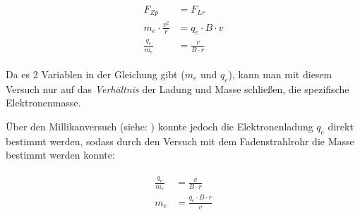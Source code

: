 \begin{align}
\begin{split}
	F_{Zp} &= F_{Lr} \\
	m_e \cdot \frac{v^2}{r} &= q_e \cdot B \cdot v \\
	\frac{q_e}{m_e} &=\frac{v}{B \cdot r}
\end{split}
\end{align}

\noindent Da es 2 Variablen in der Gleichung gibt ($m_e$ und $q_e$), kann man mit diesem Versuch nur auf das \emph{Verhältnis} der Ladung und Masse schließen, die \glqq spezifische Elektronenmasse\grqq .

Über den Millikanversuch (siehe: ) konnte jedoch die Elektronenladung $q_e$ direkt bestimmt werden, sodass durch den Versuch mit dem Fadenstrahlrohr die Masse bestimmt werden konnte:

\begin{align}
\begin{split}
	\frac{q_e}{m_e} &=\frac{v}{B \cdot r} \\
	m_e &=\frac{q_e \cdot B \cdot r}{v}
\end{split}
\end{align}





